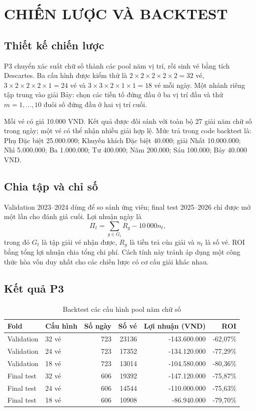 \chapter{CHIẾN LƯỢC VÀ BACKTEST}
\section{Thiết kế chiến lược}
P3 chuyển xác suất chữ số thành các pool năm vị trí, rồi sinh vé bằng tích Descartes. Ba cấu hình được kiểm thử là $2\times2\times2\times2\times2=32$ vé, $3\times2\times2\times2\times1=24$ vé và $3\times3\times2\times1\times1=18$ vé mỗi ngày. Một nhánh riêng tập trung vào giải Bảy: chọn các tiền tố đứng đầu ở ba vị trí đầu và thử $m=1,\ldots,10$ đuôi số đứng đầu ở hai vị trí cuối.

Mỗi vé có giá 10.000 VND. Kết quả được đối sánh với toàn bộ 27 giải năm chữ số trong ngày; một vé có thể nhận nhiều giải hợp lệ. Mức trả trong code backtest là: Phụ Đặc biệt 25.000.000; Khuyến khích Đặc biệt 40.000; giải Nhất 10.000.000; Nhì 5.000.000; Ba 1.000.000; Tư 400.000; Năm 200.000; Sáu 100.000; Bảy 40.000 VND.

\section{Chia tập và chỉ số}
Validation 2023--2024 dùng để so sánh ứng viên; final test 2025--2026 chỉ được mở một lần cho đánh giá cuối. Lợi nhuận ngày là
\[
\Pi_t=\sum_{g\in G_t}R_g-10\,000 n_t,
\]
trong đó $G_t$ là tập giải vé nhận được, $R_g$ là tiền trả của giải và $n_t$ là số vé. ROI bằng tổng lợi nhuận chia tổng chi phí. Cách tính này tránh áp dụng một công thức hòa vốn duy nhất cho các chiến lược có cơ cấu giải khác nhau.

\section{Kết quả P3}
\begin{table}[H]\centering\small
\caption{Backtest các cấu hình pool năm chữ số}\label{tab:p3-summary}
\begin{tabular}{llrrrr}\toprule
Fold & Cấu hình & Số ngày & Số vé & Lợi nhuận (VND) & ROI\\\midrule
Validation & 32 vé & 723 & 23136 & -143.600.000 & -62,07\%\\
Validation & 24 vé & 723 & 17352 & -134.120.000 & -77,29\%\\
Validation & 18 vé & 723 & 13014 & -104.580.000 & -80,36\%\\
Final test & 32 vé & 606 & 19392 & -147.120.000 & -75,87\%\\
Final test & 24 vé & 606 & 14544 & -110.000.000 & -75,63\%\\
Final test & 18 vé & 606 & 10908 & -86.940.000 & -79,70\%\\\bottomrule
\end{tabular}\end{table}

